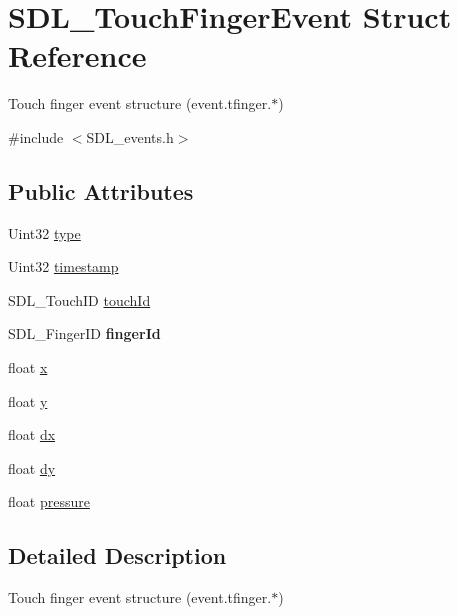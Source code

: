 \hypertarget{structSDL__TouchFingerEvent}{}\section{S\+D\+L\+\_\+\+Touch\+Finger\+Event Struct Reference}
\label{structSDL__TouchFingerEvent}


Touch finger event structure (event.\+tfinger.$\ast$)  




{\ttfamily \#include $<$S\+D\+L\+\_\+events.\+h$>$}

\subsection*{Public Attributes}
\begin{DoxyCompactItemize}
\item 
Uint32 \hyperlink{structSDL__TouchFingerEvent_a3883218fa3426065ca66086c100edbfa}{type}
\item 
Uint32 \hyperlink{structSDL__TouchFingerEvent_abde2ab5cb013bbd21e37a65e2f8fa666}{timestamp}
\item 
S\+D\+L\+\_\+\+Touch\+ID \hyperlink{structSDL__TouchFingerEvent_ad7a6f39ec9af1bf47b160d18314edd70}{touch\+Id}
\item 
\mbox{\label{structSDL__TouchFingerEvent_a8616d46ed19906e3ee90a4d481d3a284}} 
S\+D\+L\+\_\+\+Finger\+ID {\bfseries finger\+Id}
\item 
float \hyperlink{structSDL__TouchFingerEvent_a0ce44b1342220fa17e9b9b4a77c2c906}{x}
\item 
float \hyperlink{structSDL__TouchFingerEvent_ac2bb8af638d2927a8e13f6ffe8f9384e}{y}
\item 
float \hyperlink{structSDL__TouchFingerEvent_ac6acac209d6e2bd659fdb6760081393d}{dx}
\item 
float \hyperlink{structSDL__TouchFingerEvent_a9c0320c5f18a6b9d10da657e166608c9}{dy}
\item 
float \hyperlink{structSDL__TouchFingerEvent_ab4fca822d0807b5748dbae8d3cc56524}{pressure}
\end{DoxyCompactItemize}


\subsection{Detailed Description}
Touch finger event structure (event.\+tfinger.$\ast$) 

